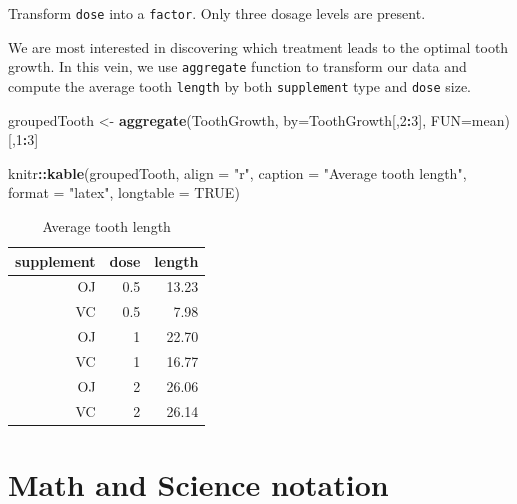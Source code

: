 \documentclass[12pt,oneside]{chicagocapstone}
\newenvironment{Shaded}{\begin{snugshade}}{\end{snugshade}}
\newcommand{\DataTypeTok}[1]{\textcolor[rgb]{0.13,0.29,0.53}{#1}}
\newcommand{\DecValTok}[1]{\textcolor[rgb]{0.00,0.00,0.81}{#1}}
\newcommand{\KeywordTok}[1]{\textcolor[rgb]{0.13,0.29,0.53}{\textbf{#1}}}
\newcommand{\NormalTok}[1]{#1}
\newcommand{\OperatorTok}[1]{\textcolor[rgb]{0.81,0.36,0.00}{\textbf{#1}}}
\newcommand{\OtherTok}[1]{\textcolor[rgb]{0.56,0.35,0.01}{#1}}
\newcommand{\StringTok}[1]{\textcolor[rgb]{0.31,0.60,0.02}{#1}}
\begin{document}
Transform \texttt{dose} into a \texttt{factor}. Only three dosage levels are present.
\begin{Shaded}
\end{Shaded}
We are most interested in discovering which treatment leads to the optimal tooth growth.
In this vein, we use \texttt{aggregate} function to transform our data and compute the average tooth \texttt{length} by both \texttt{supplement} type and \texttt{dose} size.
\begin{Shaded}
\begin{Highlighting}[]
\NormalTok{groupedTooth <-}\StringTok{ }\KeywordTok{aggregate}\NormalTok{(ToothGrowth, }\DataTypeTok{by=}\NormalTok{ToothGrowth[,}\DecValTok{2}\OperatorTok{:}\DecValTok{3}\NormalTok{], }\DataTypeTok{FUN=}\NormalTok{mean)[,}\DecValTok{1}\OperatorTok{:}\DecValTok{3}\NormalTok{]}

\NormalTok{knitr}\OperatorTok{::}\KeywordTok{kable}\NormalTok{(groupedTooth, }\DataTypeTok{align =} \StringTok{"r"}\NormalTok{, }\DataTypeTok{caption =} \StringTok{"Average tooth length"}\NormalTok{,}
      \DataTypeTok{format =} \StringTok{"latex"}\NormalTok{, }\DataTypeTok{longtable =} \OtherTok{TRUE}\NormalTok{)}
\end{Highlighting}
\end{Shaded}
\begin{longtable}[t]{r|r|r}
\caption{\label{tab:group}Average tooth length}\\
\hline
supplement & dose & length\\
\hline
OJ & 0.5 & 13.23\\
\hline
VC & 0.5 & 7.98\\
\hline
OJ & 1 & 22.70\\
\hline
VC & 1 & 16.77\\
\hline
OJ & 2 & 26.06\\
\hline
VC & 2 & 26.14\\
\hline
\end{longtable}
\newpage

\hypertarget{math-sci}{%
\section*{Math and Science notation}\label{math-sci}}
\end{document}
